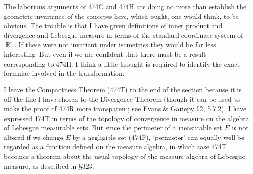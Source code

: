 {The laborious arguments of 474C and 
474H are doing no more than establish the
geometric invariance of the concepts here, which ought, one would think, to
be obvious.   The trouble is that I have given
definitions of inner product and divergence and Lebesgue measure
in terms of the standard coordinate system of $\BbbR^r$.
If these were not invariant under isometries they would be far less
interesting.   But even if we are confident that there must be a result
corresponding to 474H, I think a little thought is required to identify the
exact formulae involved in the transformation.

I leave the Compactness Theorem (474T) to the end of the section because
it is off the line I have chosen to the Divergence Theorem (though it
can be used to make the proof of 474R more transparent;
see {\smc Evans \& Gariepy 92}, 5.7.2).
I have expressed 474T in terms of the topology of convergence in measure
on the algebra of Lebesgue measurable sets.   But since the perimeter of
a measurable set $E$ is not altered if we change $E$ by a negligible
set (474F),
`perimeter' can equally well be regarded as a function defined on
the measure algebra, in which case 474T becomes a theorem about the
usual topology of the measure algebra of Lebesgue measure, as described
in \S323.
}%

\discrpage

